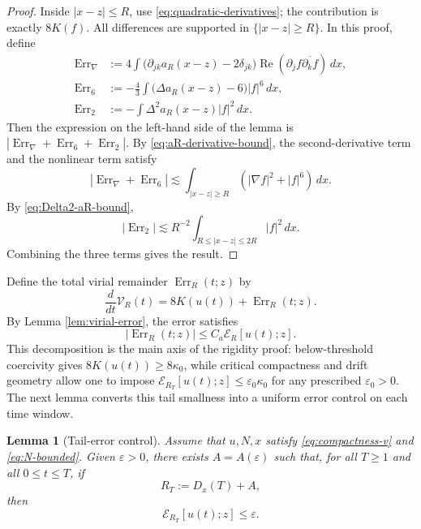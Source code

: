 \documentclass[smallextended,envcountsect,nospthms]{svjour3}
\numberwithin{equation}{section}
\theoremstyle{spbreak}
\newtheorem{lemma}[theorem]{Lemma}
\theoremstyle{spdefbreak}
\theoremstyle{spdefbreak}
\newcommand{\eps}{\varepsilon}
\newcommand{\Err}{\operatorname{Err}}
\begin{document}
\begin{proof}
Inside $|x-z|\le R$, use \eqref{eq:quadratic-derivatives}; the contribution is exactly $8K(f)$. All differences are supported in $\{|x-z|\ge R\}$. In this proof, define
\begin{align*}
  \Err_\nabla
  &:=4\int\bigl(\partial_{jk}a_R(x-z)-2\delta_{jk}\bigr)
       \operatorname{Re}(\partial_jf\overline{\partial_kf})\,dx,\\
  \Err_6
  &:=-\frac43\int\bigl(\Delta a_R(x-z)-6\bigr)|f|^6\,dx,\\
  \Err_2
  &:=-\int\Delta^2a_R(x-z)|f|^2\,dx.
\end{align*}
Then the expression on the left-hand side of the lemma is $|\Err_\nabla+\Err_6+\Err_2|$. By \eqref{eq:aR-derivative-bound}, the second-derivative term and the nonlinear term satisfy
\begin{equation*}
  |\Err_\nabla+\Err_6|
  \lesssim \int_{|x-z|\ge R}(|\nabla f|^2+|f|^6)\,dx.
\end{equation*}
By \eqref{eq:Delta2-aR-bound},
\begin{equation*}
  |\Err_2|
  \lesssim R^{-2}\int_{R\le|x-z|\le2R}|f|^2\,dx.
\end{equation*}
Combining the three terms gives the result.
\end{proof}

Define the total virial remainder $\operatorname{Err}_R(t;z)$ by
\begin{equation*}
  \frac{d}{dt}\mathcal V_R(t)=8K(u(t))+\operatorname{Err}_R(t;z).
\end{equation*}
By Lemma \ref{lem:virial-error}, the error satisfies
\begin{equation*}
  |\operatorname{Err}_R(t;z)|\le C_a\mathcal E_R[u(t);z].
\end{equation*}
This decomposition is the main axis of the rigidity proof: below-threshold coercivity gives $8K(u(t))\ge8\kappa_0$, while critical compactness and drift geometry allow one to impose $\mathcal E_{R_T}[u(t);z]\le\varepsilon_0\kappa_0$ for any prescribed $\varepsilon_0>0$. The next lemma converts this tail smallness into a uniform error control on each time window.

\begin{lemma}[Tail-error control]\label{lem:tail-error-control}
Assume that $u,N,x$ satisfy \eqref{eq:compactness-v} and \eqref{eq:N-bounded}. Given $\eps>0$, there exists $A=A(\eps)$ such that, for all $T\ge1$ and all $0\le t\le T$, if
\begin{equation*}
  R_T:=D_x(T)+A,
\end{equation*}
then
\begin{equation}\label{eq:ET-small}
  \mathcal E_{R_T}[u(t);z]\le\eps.
\end{equation}
\end{lemma}
\end{document}
